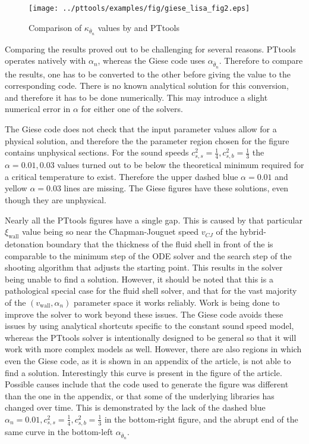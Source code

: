 \begin{figure}[ht!]
\centering
\texttt{[image: ../pttools/examples/fig/giese\_lisa\_fig2.eps]}
\caption{Comparison of $\kappa_{\bar{\theta}_n}$ values by \cite[fig. 2]{giese_2021} and PTtools}
\label{fig:kappa_giese}
\end{figure}

Comparing the results proved out to be challenging for several reasons.
PTtools operates natively with $\alpha_n$, whereas the Giese code uses $\alpha_{\bar{\theta}_n}$.
Therefore to compare the results, one has to be converted to the other before giving the value to the corresponding code.
There is no known analytical solution for this conversion, and therefore it has to be done numerically.
This may introduce a slight numerical error in $\alpha$ for either one of the solvers.

The Giese code does not check that the input parameter values allow for a physical solution,
and therefore the the parameter region chosen for the figure contains unphysical sections.
For the sound speeds $c_{s,s}^2 = \frac{1}{4}, c_{s,b}^2 = \frac{1}{3}$ the $\alpha = 0.01, 0.03$ values turned out to be below the theoretical minimum
required for a critical temperature to exist.
Therefore the upper dashed blue $\alpha = 0.01$ and yellow $\alpha = 0.03$ lines are missing.
The Giese figures have these solutions, even though they are unphysical.

Nearly all the PTtools figures have a single gap.
This is caused by that particular $\xi_\text{wall}$ value being so near the Chapman-Jouguet speed $v_{CJ}$ of the hybrid-detonation boundary
that the thickness of the fluid shell in front of the is comparable to the minimum step of the ODE solver
and the search step of the shooting algorithm that adjusts the starting point.
This results in the solver being unable to find a solution.
However, it should be noted that this is a pathological special case for the fluid shell solver,
and that for the vast majority of the $(v_\text{wall}, \alpha_n)$ parameter space it works reliably.
Work is being done to improve the solver to work beyond these issues.
The Giese code avoids these issues by using analytical shortcuts specific to the constant sound speed model,
whereas the PTtools solver is intentionally designed to be general so that it will work with more complex models as well.
However, there are also regions in which even the Giese code, as it is shown in an appendix of the article, is not able to find a solution.
Interestingly this curve is present in the figure of the article.
Possible causes include that the code used to generate the figure was different than the one in the appendix,
or that some of the underlying libraries has changed over time.
This is demonstrated by the lack of the dashed blue $\alpha_n = 0.01, c_{s,s}^2 = \frac{1}{4}, c_{s,b}^2 = \frac{1}{3}$ in the bottom-right figure,
and the abrupt end of the same curve in the bottom-left $\alpha_{\bar{\theta}_n}$.

